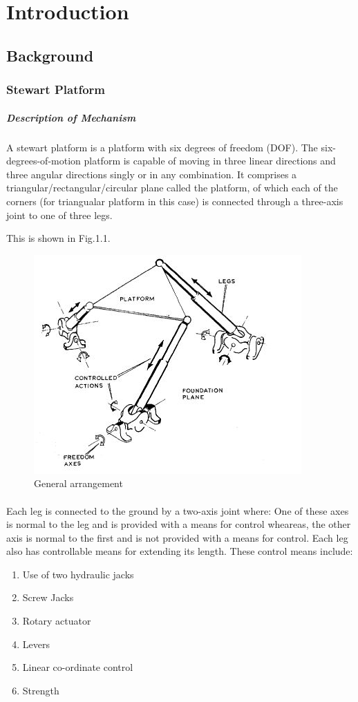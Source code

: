 \section{Introduction}
\subsection{Background}
\subsubsection{Stewart Platform}
\subparagraph*{Description of Mechanism}
\paragraph{}A stewart platform is a platform with six degrees of freedom (DOF). The six-degrees-of-motion platform is capable of moving in three linear directions and
three angular directions singly or in any combination.
It comprises a triangular/rectangular/circular plane called the platform, of which each of the corners (for triangualar platform in this case) is connected through a three-axis joint to one of three legs.

 This is shown in Fig.1.1.
\begin{center}
	\begin{figure}[!h]
	\centering
	\includegraphics{Figures/Fig1}
	\caption{General arrangement}
	\end{figure}
\end{center}
\paragraph{}Each leg is connected to the ground by a two-axis joint where: One of these axes is
normal to the leg and is provided with a means for control wheareas, the other axis is normal to the first and is not provided with a means for control.
Each leg also has controllable means for extending its length. These control means include:
\begin{enumerate}
\item Use of two hydraulic jacks
\item Screw Jacks
\item Rotary actuator
\item Levers
\item Linear co-ordinate control
\item Strength
\end{enumerate}
